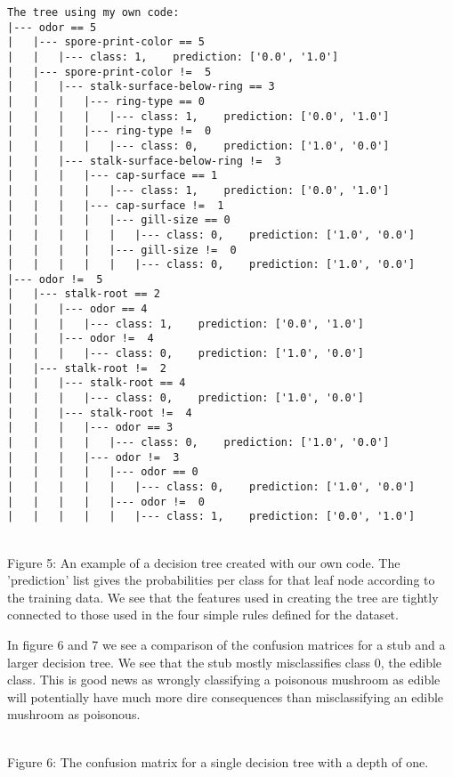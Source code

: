 \documentclass[11pt]{article}
\begin{document}
\begin{BVerbatim}
The tree using my own code:
|--- odor == 5
|   |--- spore-print-color == 5
|   |   |--- class: 1,    prediction: ['0.0', '1.0']
|   |--- spore-print-color !=  5
|   |   |--- stalk-surface-below-ring == 3
|   |   |   |--- ring-type == 0
|   |   |   |   |--- class: 1,    prediction: ['0.0', '1.0']
|   |   |   |--- ring-type !=  0
|   |   |   |   |--- class: 0,    prediction: ['1.0', '0.0']
|   |   |--- stalk-surface-below-ring !=  3
|   |   |   |--- cap-surface == 1
|   |   |   |   |--- class: 1,    prediction: ['0.0', '1.0']
|   |   |   |--- cap-surface !=  1
|   |   |   |   |--- gill-size == 0
|   |   |   |   |   |--- class: 0,    prediction: ['1.0', '0.0']
|   |   |   |   |--- gill-size !=  0
|   |   |   |   |   |--- class: 0,    prediction: ['1.0', '0.0']
|--- odor !=  5
|   |--- stalk-root == 2
|   |   |--- odor == 4
|   |   |   |--- class: 1,    prediction: ['0.0', '1.0']
|   |   |--- odor !=  4
|   |   |   |--- class: 0,    prediction: ['1.0', '0.0']
|   |--- stalk-root !=  2
|   |   |--- stalk-root == 4
|   |   |   |--- class: 0,    prediction: ['1.0', '0.0']
|   |   |--- stalk-root !=  4
|   |   |   |--- odor == 3
|   |   |   |   |--- class: 0,    prediction: ['1.0', '0.0']
|   |   |   |--- odor !=  3
|   |   |   |   |--- odor == 0
|   |   |   |   |   |--- class: 0,    prediction: ['1.0', '0.0']
|   |   |   |   |--- odor !=  0
|   |   |   |   |   |--- class: 1,    prediction: ['0.0', '1.0']	
\end{BVerbatim}
\\
Figure 5: An example of a decision tree created with our own code. The 'prediction' list gives the probabilities per class for that leaf node according to the training data. We see that the features used in creating the tree are tightly connected to those used in the four simple rules defined for the dataset.
{ \hspace*{\fill} \\}

In figure 6 and 7 we see a comparison of the confusion matrices for a stub and a larger decision tree. We see that the stub mostly misclassifies class 0, the edible class. This is good news as wrongly classifying a poisonous mushroom as edible will potentially have much more dire consequences than misclassifying an edible mushroom as poisonous.

\begin{center}
\end{center}
{ \hspace*{\fill} \\}
Figure 6: The confusion matrix for a single decision tree with a depth of one.
\end{document}
